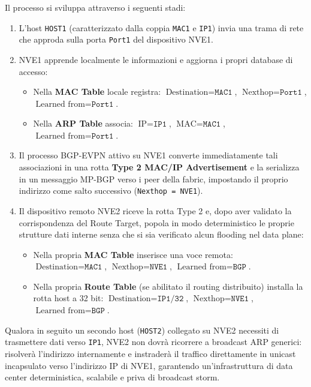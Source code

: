 \documentclass[11pt, a4paper]{article}
\begin{document}
Il processo si sviluppa attraverso i seguenti stadi:
\begin{enumerate}
    \item L'host \texttt{HOST1} (caratterizzato dalla coppia \texttt{MAC1} e \texttt{IP1}) invia una trama di rete che approda sulla porta \texttt{Port1} del dispositivo NVE1.
    \item NVE1 apprende localmente le informazioni e aggiorna i propri database di accesso:
    \begin{itemize}[noitemsep]
        \item Nella \textbf{MAC Table} locale registra: $\text{Destination} = \texttt{MAC1}$, $\text{Nexthop} = \texttt{Port1}$, $\text{Learned from} = \texttt{Port1}$.
        \item Nella \textbf{ARP Table} associa: $\text{IP} = \texttt{IP1}$, $\text{MAC} = \texttt{MAC1}$, $\text{Learned from} = \texttt{Port1}$.
    \end{itemize}
    \item Il processo BGP-EVPN attivo su NVE1 converte immediatamente tali associazioni in una rotta \textbf{Type 2 MAC/IP Advertisement} e la serializza in un messaggio MP-BGP verso i peer della fabric, impostando il proprio indirizzo come salto successivo (\texttt{Nexthop = NVE1}).
    \item Il dispositivo remoto NVE2 riceve la rotta Type 2 e, dopo aver validato la corrispondenza del Route Target, popola in modo deterministico le proprie strutture dati interne senza che si sia verificato alcun flooding nel data plane:
    \begin{itemize}[noitemsep]
        \item Nella propria \textbf{MAC Table} inserisce una voce remota: $\text{Destination} = \texttt{MAC1}$, $\text{Nexthop} = \texttt{NVE1}$, $\text{Learned from} = \texttt{BGP}$.
        \item Nella propria \textbf{Route Table} (se abilitato il routing distribuito) installa la rotta host a 32 bit: $\text{Destination} = \texttt{IP1/32}$, $\text{Nexthop} = \texttt{NVE1}$, $\text{Learned from} = \texttt{BGP}$.
    \end{itemize}
\end{enumerate}

Qualora in seguito un secondo host (\texttt{HOST2}) collegato su NVE2 necessiti di trasmettere dati verso \texttt{IP1}, NVE2 non dovrà ricorrere a broadcast ARP generici: risolverà l'indirizzo internamente e instraderà il traffico direttamente in unicast incapsulato verso l'indirizzo IP di NVE1, garantendo un'infrastruttura di data center deterministica, scalabile e priva di broadcast storm.
\end{document}

